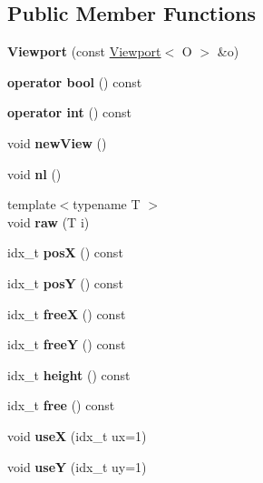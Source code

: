 \subsection*{Public Member Functions}
\begin{DoxyCompactItemize}
\item 
\mbox{\label{classViewport_a1cafbe4a659f0ec9c7f1ca5db7eb91aa}} 
{\bfseries Viewport} (const \hyperlink{classViewport}{Viewport}$<$ O $>$ \&o)
\item 
\mbox{\label{classViewport_a4e959f240222aab16aee4ce03b641581}} 
{\bfseries operator bool} () const
\item 
\mbox{\label{classViewport_a9efb45658a7e1d6ec9dc72084104a5ee}} 
{\bfseries operator int} () const
\item 
\mbox{\label{classViewport_abf0bc42257a0f9d953e4ad2613376e80}} 
void {\bfseries new\+View} ()
\item 
\mbox{\label{classViewport_a8c4ea4260d72a77fa6c8ce3ac6ca3ab9}} 
void {\bfseries nl} ()
\item 
\mbox{\label{classViewport_a0022f5904793f27850b59a962baefc6c}} 
{\footnotesize template$<$typename T $>$ }\\void {\bfseries raw} (T i)
\item 
\mbox{\label{classViewport_a7abe930c38ac49af5f9bdb6819230db1}} 
idx\+\_\+t {\bfseries posX} () const
\item 
\mbox{\label{classViewport_acfce7bb5ef527d258665cdc6cbcf1bb3}} 
idx\+\_\+t {\bfseries posY} () const
\item 
\mbox{\label{classViewport_a06867c0b9c55862fa920ca3125a5c35c}} 
idx\+\_\+t {\bfseries freeX} () const
\item 
\mbox{\label{classViewport_ad8b33c394b3279136d86e4df00ffcb15}} 
idx\+\_\+t {\bfseries freeY} () const
\item 
\mbox{\label{classViewport_a4b091736ce8bab0a3e241dab0ab1e489}} 
idx\+\_\+t {\bfseries height} () const
\item 
\mbox{\label{classViewport_a2a7688c8d66fff51fdbc6752aa0c3d96}} 
idx\+\_\+t {\bfseries free} () const
\item 
\mbox{\label{classViewport_afc2a00bfbc1dde28b7840e9f94eaf7a5}} 
void {\bfseries useX} (idx\+\_\+t ux=1)
\item 
\mbox{\label{classViewport_a080e7d4c81cbf1f4f1ec612278e374b0}} 
void {\bfseries useY} (idx\+\_\+t uy=1)
\end{DoxyCompactItemize}
